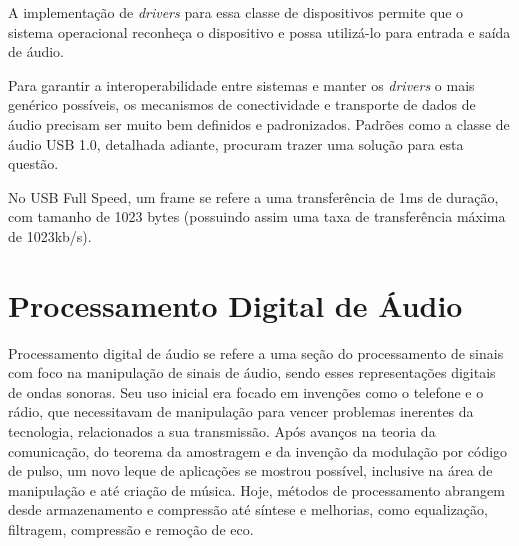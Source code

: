 



A implementação de \textit{drivers} para essa classe de dispositivos permite que o sistema operacional reconheça o dispositivo e possa utilizá-lo para entrada e saída de áudio. 

Para garantir a interoperabilidade entre sistemas e manter os \textit{drivers} o mais genérico possíveis, os mecanismos de conectividade e transporte de dados de áudio precisam ser muito bem definidos e padronizados.  Padrões como a classe de áudio USB 1.0, detalhada adiante, procuram trazer uma solução para esta questão.





No USB Full Speed, um frame se refere a uma transferência de 1ms de duração, com tamanho de 1023 bytes (possuindo assim uma taxa de transferência máxima de 1023kb/s).




\section{Processamento Digital de Áudio}
Processamento digital de áudio se refere a uma seção do processamento de sinais com foco na manipulação de sinais de áudio, sendo esses representações digitais de ondas sonoras.
Seu uso inicial era focado em invenções como o telefone e o rádio, que necessitavam de manipulação para vencer problemas inerentes da tecnologia, relacionados a sua transmissão.
Após avanços na teoria da comunicação, do teorema da amostragem e da invenção da modulação por código de pulso, um novo leque de aplicações se mostrou possível, inclusive na área de manipulação e até criação de música.
Hoje, métodos de processamento abrangem desde armazenamento e compressão até síntese e melhorias, como equalização, filtragem, compressão e remoção de eco.

